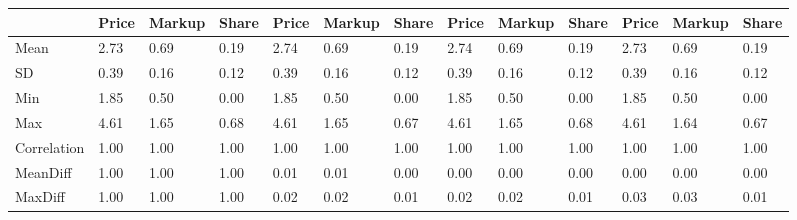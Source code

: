 \begin{table}[htbp]
\begin{tabular}{lllllllllllll} \hline \hline
 & Price  & Markup  & Share  & Price  & Markup  & Share  & Price  & Markup  & Share  & Price  & Markup  & Share  \\  \hline 
Mean &      2.73 &      0.69 &      0.19 &      2.74 &      0.69 &      0.19 &      2.74 &      0.69 &      0.19 &      2.73 &      0.69 &      0.19 \\  
SD &      0.39 &      0.16 &      0.12 &      0.39 &      0.16 &      0.12 &      0.39 &      0.16 &      0.12 &      0.39 &      0.16 &      0.12 \\  
Min &      1.85 &      0.50 &      0.00 &      1.85 &      0.50 &      0.00 &      1.85 &      0.50 &      0.00 &      1.85 &      0.50 &      0.00 \\  
Max &      4.61 &      1.65 &      0.68 &      4.61 &      1.65 &      0.67 &      4.61 &      1.65 &      0.68 &      4.61 &      1.64 &      0.67 \\  
Correlation &      1.00 &      1.00 &      1.00 &      1.00 &      1.00 &      1.00 &      1.00 &      1.00 &      1.00 &      1.00 &      1.00 &      1.00 \\  
MeanDiff &      1.00 &      1.00 &      1.00 &      0.01 &      0.01 &      0.00 &      0.00 &      0.00 &      0.00 &      0.00 &      0.00 &      0.00 \\  
MaxDiff &      1.00 &      1.00 &      1.00 &      0.02 &      0.02 &      0.01 &      0.02 &      0.02 &      0.01 &      0.03 &      0.03 &      0.01 \\  
\hline \hline \end{tabular}
\end{table}
